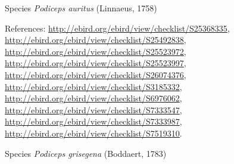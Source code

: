 \documentclass[9pt, article]{memoir}
\begin{document}
\begin{multicols}{2}
\vspace{6pt}\noindent\hspace{36pt}Species \textit{Podiceps auritus} (Linnaeus, 1758)


\vspace{6pt}References: 
\url{http://ebird.org/ebird/view/checklist/S25368335}, 
\url{http://ebird.org/ebird/view/checklist/S25492838}, 
\url{http://ebird.org/ebird/view/checklist/S25523972}, 
\url{http://ebird.org/ebird/view/checklist/S25523997}, 
\url{http://ebird.org/ebird/view/checklist/S26074376}, 
\url{http://ebird.org/ebird/view/checklist/S3185332}, 
\url{http://ebird.org/ebird/view/checklist/S6976062}, 
\url{http://ebird.org/ebird/view/checklist/S7333547}, 
\url{http://ebird.org/ebird/view/checklist/S7333987}, 
\url{http://ebird.org/ebird/view/checklist/S7519310}.

\vspace{6pt}\noindent\hspace{36pt}Species \textit{Podiceps grisegena} (Boddaert, 1783)



\end{multicols}
\end{document}

